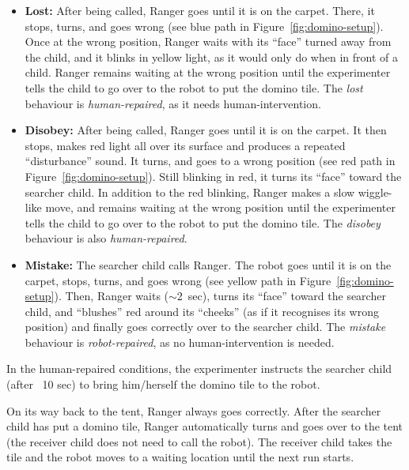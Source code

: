 \documentclass{sig-alternate}
\begin{document}
\begin{itemize}	

    \item \textbf{Lost:} After being called, Ranger goes until it is on the
    carpet. There, it stops, turns, and goes wrong (see blue path in
    Figure~\ref{fig:domino-setup}). Once at the wrong position, Ranger waits
    with its ``face'' turned away from the child, and it blinks in yellow light,
    as it would only do when in front of a child. Ranger remains waiting at the wrong
    position until the experimenter tells the child to go over to the robot to
    put the domino tile. The \textit{lost} behaviour is \textit{human-repaired},
    as it needs human-intervention.

    \item \textbf{Disobey:} After being called, Ranger goes until it is on the
    carpet. It then stops, makes red
    light all over its surface and produces a repeated ``disturbance'' sound. It
    turns, and goes to a wrong position (see red path in
    Figure~\ref{fig:domino-setup}). Still blinking in red, it turns its ``face''
    toward the searcher child. In addition to the red blinking, Ranger
    makes a slow wiggle-like move, and remains waiting at the wrong position
    until the experimenter tells the child to go over to the robot to put the
    domino tile. The \textit{disobey} behaviour is also \textit{human-repaired}.

    \item \textbf{Mistake:} The searcher child calls Ranger. The robot goes until
    it is on the carpet, stops, turns, and goes wrong (see yellow path in
    Figure~\ref{fig:domino-setup}). Then, Ranger waits ($\sim$2~sec), turns its
    ``face'' toward the searcher child, and ``blushes'' red around its ``cheeks''
    (as if it recognises its wrong position) and finally goes correctly over to
    the searcher child. The \textit{mistake} behaviour is \textit{robot-repaired},
    as no human-intervention is needed.

\end{itemize}

In the human-repaired conditions, the experimenter instructs the searcher child
(after ~10 sec) to bring him/herself the domino tile to the robot.

On its way back to the tent, Ranger always goes correctly. After the searcher
child has put a domino tile, Ranger automatically turns and goes over to the
tent (the receiver child does not need to call the robot). The receiver child
takes the tile and the robot moves to a waiting location until the next run
starts.
\end{document}

